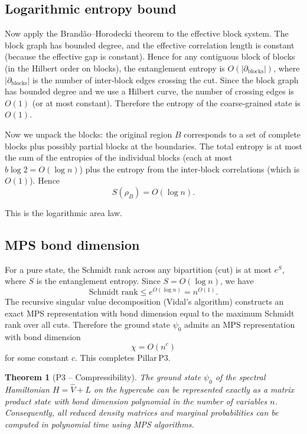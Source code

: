 \documentclass[11pt,a4paper]{article}
\newtheorem{theorem}{Theorem}[section]
\begin{document}
\subsection{Logarithmic entropy bound}
Now apply the Brandão–Horodecki theorem to the effective block system. The block graph has bounded degree, and the effective correlation length is constant (because the effective gap is constant). Hence for any contiguous block of blocks (in the Hilbert order on blocks), the entanglement entropy is \(O(|\partial_{\text{blocks}}|)\), where \(|\partial_{\text{blocks}}|\) is the number of inter‑block edges crossing the cut. Since the block graph has bounded degree and we use a Hilbert curve, the number of crossing edges is \(O(1)\) (or at most constant). Therefore the entropy of the coarse‑grained state is \(O(1)\).

Now we unpack the blocks: the original region \(B\) corresponds to a set of complete blocks plus possibly partial blocks at the boundaries. The total entropy is at most the sum of the entropies of the individual blocks (each at most \(b \log 2 = O(\log n)\)) plus the entropy from the inter‑block correlations (which is \(O(1)\)). Hence
\[
S(\rho_B) = O(\log n).
\]

This is the logarithmic area law.

\subsection{MPS bond dimension}

For a pure state, the Schmidt rank across any bipartition (cut) is at most \(e^{S}\), where \(S\) is the entanglement entropy. Since \(S = O(\log n)\), we have
\[
\text{Schmidt rank} \le e^{O(\log n)} = n^{O(1)}.
\]
The recursive singular value decomposition (Vidal's algorithm) constructs an exact MPS representation with bond dimension equal to the maximum Schmidt rank over all cuts. Therefore the ground state \(\psi_0\) admits an MPS representation with bond dimension
\[
\chi = O(n^c)
\]
for some constant \(c\). This completes Pillar P3.

\begin{theorem}[P3 – Compressibility]\label{thm:p3}
The ground state \(\psi_0\) of the spectral Hamiltonian \(H = \hat{V} + L\) on the hypercube can be represented exactly as a matrix product state with bond dimension polynomial in the number of variables \(n\). Consequently, all reduced density matrices and marginal probabilities can be computed in polynomial time using MPS algorithms.
\end{theorem}
\end{document}
